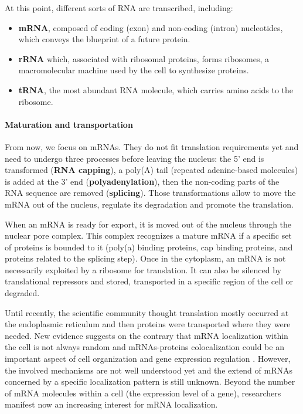 \noindent
At this point, different sorts of \ac{RNA} are transcribed, including:
\begin{itemize}
	\item \textbf{\ac{mRNA}}, composed of coding (exon) and non-coding (intron) nucleotides, which conveys the blueprint of a future protein.
	\item \textbf{\ac{rRNA}} which, associated with ribosomal proteins, forms ribosomes, a macromolecular machine used by the cell to synthesize proteins.
	\item \textbf{\ac{tRNA}}, the most abundant \ac{RNA} molecule, which carries amino acids to the ribosome.
\end{itemize}

\paragraph{Maturation and transportation}

From now, we focus on \ac{mRNA}s. They do not fit translation requirements yet and need to undergo three processes before leaving the nucleus: the 5' end is transformed (\textbf{\ac{RNA} capping}), a poly(A) tail (repeated adenine-based molecules) is added at the 3' end (\textbf{polyadenylation}), then the non-coding parts of the \ac{RNA} sequence are removed (\textbf{splicing}).
Those transformations allow to move the \ac{mRNA} out of the nucleus, regulate its degradation and promote the translation.

When an \ac{mRNA} is ready for export, it is moved out of the nucleus through the nuclear pore complex.
This complex recognizes a mature \ac{mRNA} if a specific set of proteins is bounded to it (poly(a) binding proteins, cap binding proteins, and proteins related to the splicing step).
Once in the cytoplasm, an \ac{mRNA} is not necessarily exploited by a ribosome for translation.
It can also be silenced by translational repressors and stored, transported in a specific region of the cell or degraded.

Until recently, the scientific community thought translation mostly occurred at the endoplasmic reticulum and then proteins were transported where they were needed.
New evidence suggests on the contrary that \ac{mRNA} localization within the cell is not always random and \ac{mRNA}s-proteins colocalization could be an important aspect of cell organization and gene expression regulation \cite{Lecuyer2007}.
However, the involved mechanisms are not well understood yet and the extend of \ac{mRNA}s concerned by a specific localization pattern is still unknown.
Beyond the number of \ac{mRNA} molecules within a cell (the expression level of a gene), researchers manifest now an increasing interest for \ac{mRNA} localization.

